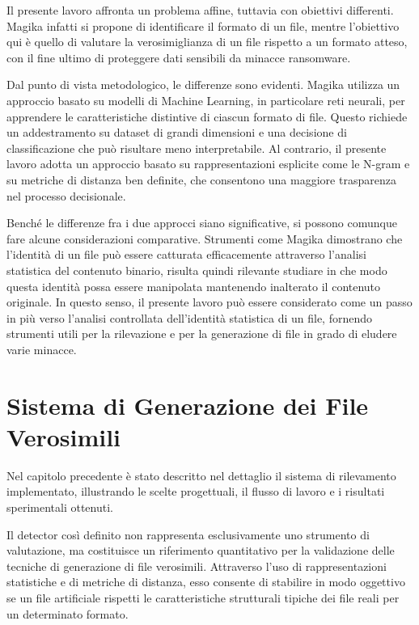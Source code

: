 \documentclass{report}
\begin{document}
\bigskip

Il presente lavoro affronta un problema affine, tuttavia con obiettivi differenti.
Magika infatti si propone di identificare il formato di un file, mentre l'obiettivo qui è quello di valutare la
verosimiglianza di un file rispetto a un formato atteso, con il fine ultimo di proteggere dati sensibili da minacce ransomware.

\bigskip

Dal punto di vista metodologico, le differenze sono evidenti.
Magika utilizza un approccio basato su modelli di Machine Learning, in particolare reti neurali, per apprendere le caratteristiche distintive 
di ciascun formato di file.
Questo richiede un addestramento su dataset di grandi dimensioni e una decisione di classificazione che può risultare meno interpretabile.
Al contrario, il presente lavoro adotta un approccio basato su rappresentazioni esplicite come le N-gram e su
metriche di distanza ben definite, che consentono una maggiore trasparenza nel processo decisionale.

\bigskip

Benché le differenze fra i due approcci siano significative, si possono comunque fare alcune considerazioni comparative.
Strumenti come Magika dimostrano che l'identità di un file può essere catturata efficacemente attraverso l'analisi statistica del contenuto binario,
risulta quindi rilevante studiare in che modo questa identità possa essere manipolata mantenendo inalterato il contenuto originale.   
In questo senso, il presente lavoro può essere considerato come un passo in più verso 
l'analisi controllata dell'identità statistica di un file, fornendo strumenti utili per la rilevazione e per 
la generazione di file in grado di eludere varie minacce.



\chapter{Sistema di Generazione dei File Verosimili}

Nel capitolo precedente è stato descritto nel dettaglio il sistema di rilevamento implementato,
illustrando le scelte progettuali, il flusso di lavoro e i risultati sperimentali ottenuti.

\bigskip

Il detector così definito non rappresenta esclusivamente uno strumento di valutazione,
ma costituisce un riferimento quantitativo per la validazione delle tecniche di
generazione di file verosimili. Attraverso l'uso di rappresentazioni statistiche
e di metriche di distanza, esso consente di stabilire in modo oggettivo se un file
artificiale rispetti le caratteristiche strutturali tipiche dei file reali per un
determinato formato.
\end{document}
